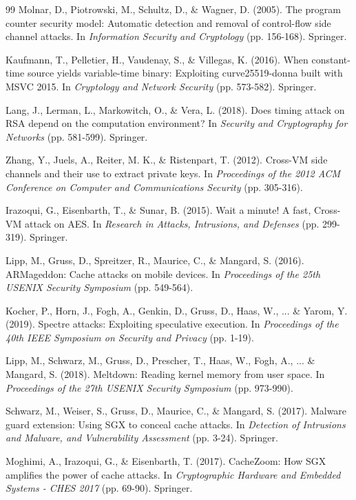 \documentclass[12pt,a4paper]{article}
\theoremstyle{definition}
\begin{document}
\begin{thebibliography}{99}
Molnar, D., Piotrowski, M., Schultz, D., \& Wagner, D. (2005).
\newblock The program counter security model: Automatic detection and removal of control-flow side channel attacks.
\newblock In \textit{Information Security and Cryptology} (pp. 156-168). Springer.

Kaufmann, T., Pelletier, H., Vaudenay, S., \& Villegas, K. (2016).
\newblock When constant-time source yields variable-time binary: Exploiting curve25519-donna built with MSVC 2015.
\newblock In \textit{Cryptology and Network Security} (pp. 573-582). Springer.

Lang, J., Lerman, L., Markowitch, O., \& Vera, L. (2018).
\newblock Does timing attack on RSA depend on the computation environment?
\newblock In \textit{Security and Cryptography for Networks} (pp. 581-599). Springer.

Zhang, Y., Juels, A., Reiter, M. K., \& Ristenpart, T. (2012).
\newblock Cross-VM side channels and their use to extract private keys.
\newblock In \textit{Proceedings of the 2012 ACM Conference on Computer and Communications Security} (pp. 305-316).

Irazoqui, G., Eisenbarth, T., \& Sunar, B. (2015).
\newblock Wait a minute! A fast, Cross-VM attack on AES.
\newblock In \textit{Research in Attacks, Intrusions, and Defenses} (pp. 299-319). Springer.

Lipp, M., Gruss, D., Spreitzer, R., Maurice, C., \& Mangard, S. (2016).
\newblock ARMageddon: Cache attacks on mobile devices.
\newblock In \textit{Proceedings of the 25th USENIX Security Symposium} (pp. 549-564).

Kocher, P., Horn, J., Fogh, A., Genkin, D., Gruss, D., Haas, W., ... \& Yarom, Y. (2019).
\newblock Spectre attacks: Exploiting speculative execution.
\newblock In \textit{Proceedings of the 40th IEEE Symposium on Security and Privacy} (pp. 1-19).

Lipp, M., Schwarz, M., Gruss, D., Prescher, T., Haas, W., Fogh, A., ... \& Mangard, S. (2018).
\newblock Meltdown: Reading kernel memory from user space.
\newblock In \textit{Proceedings of the 27th USENIX Security Symposium} (pp. 973-990).

Schwarz, M., Weiser, S., Gruss, D., Maurice, C., \& Mangard, S. (2017).
\newblock Malware guard extension: Using SGX to conceal cache attacks.
\newblock In \textit{Detection of Intrusions and Malware, and Vulnerability Assessment} (pp. 3-24). Springer.

Moghimi, A., Irazoqui, G., \& Eisenbarth, T. (2017).
\newblock CacheZoom: How SGX amplifies the power of cache attacks.
\newblock In \textit{Cryptographic Hardware and Embedded Systems - CHES 2017} (pp. 69-90). Springer.

\end{thebibliography}
\end{document}
